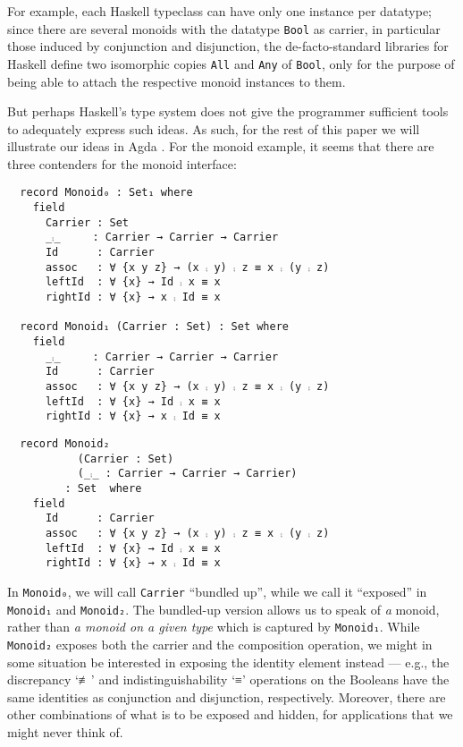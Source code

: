 \documentclass[sigplan,screen]{acmart}
\begin{document}
For example, each Haskell typeclass can have only one instance per datatype;
since there are several monoids with the datatype \texttt{Bool} as carrier,
in particular those induced by conjunction and disjunction,
the de-facto-standard libraries for Haskell
define two isomorphic copies \texttt{All} and \texttt{Any} of \texttt{Bool},
only for the purpose of being able to attach the respective monoid instances to them.

But perhaps Haskell's type system does not give the programmer sufficient
tools to adequately express such ideas. As such, for the rest of this paper
we will illustrate our ideas in Agda \cite{Norell-2007,agda_overview}.
For the monoid example,
it seems that there are three contenders for the monoid interface:

\begin{verbatim}
  record Monoid₀ : Set₁ where
    field
      Carrier : Set
      _⨾_     : Carrier → Carrier → Carrier
      Id      : Carrier
      assoc   : ∀ {x y z} → (x ⨾ y) ⨾ z ≡ x ⨾ (y ⨾ z)
      leftId  : ∀ {x} → Id ⨾ x ≡ x
      rightId : ∀ {x} → x ⨾ Id ≡ x

  record Monoid₁ (Carrier : Set) : Set where
    field
      _⨾_     : Carrier → Carrier → Carrier
      Id      : Carrier
      assoc   : ∀ {x y z} → (x ⨾ y) ⨾ z ≡ x ⨾ (y ⨾ z)
      leftId  : ∀ {x} → Id ⨾ x ≡ x
      rightId : ∀ {x} → x ⨾ Id ≡ x
\end{verbatim}

\begin{verbatim}
  record Monoid₂
           (Carrier : Set)
           (_⨾_ : Carrier → Carrier → Carrier)
         : Set  where
    field
      Id      : Carrier
      assoc   : ∀ {x y z} → (x ⨾ y) ⨾ z ≡ x ⨾ (y ⨾ z)
      leftId  : ∀ {x} → Id ⨾ x ≡ x
      rightId : ∀ {x} → x ⨾ Id ≡ x
\end{verbatim}

\vspace{0.3em}\noindent
In \texttt{Monoid₀}, we will call \texttt{Carrier} “bundled up”,
while we call it “exposed” in \texttt{Monoid₁} and \texttt{Monoid₂}.
The bundled-up version allows us to speak of \emph{a}
monoid, rather than \emph{a monoid on a given type} which is captured by \texttt{Monoid₁}.
While \texttt{Monoid₂} exposes both the carrier and the composition operation,
we might in some situation be interested
in exposing the identity element instead
--- e.g., the discrepancy ‘≢’ and indistinguishability ‘≡’ operations
on the Booleans
have the same identities as conjunction and disjunction, respectively.
Moreover, there are other combinations of what is to be exposed and hidden,
for applications that we might never think of.
\end{document}
